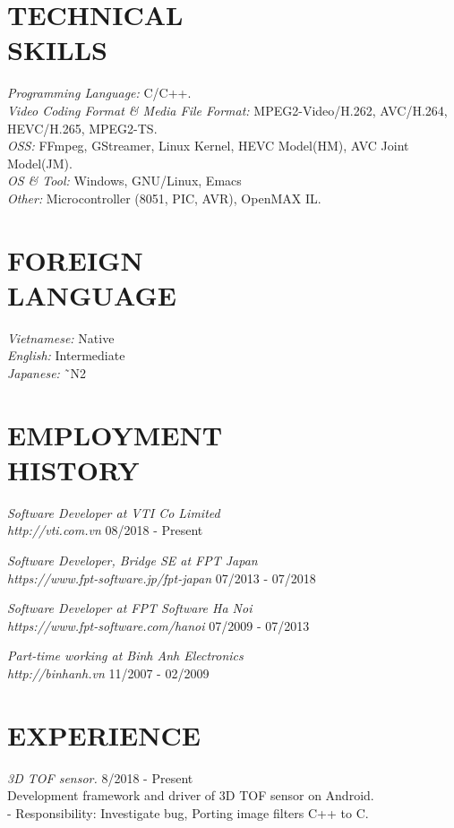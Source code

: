 \documentclass[margin]{res}
\begin{document}
\begin{resume}
\section{TECHNICAL \\ SKILLS}
        {\sl Programming Language:} C/C++. \\
        {\sl Video Coding Format \& Media File Format:} MPEG2-Video/H.262, AVC/H.264, HEVC/H.265, MPEG2-TS.\\
        {\sl OSS:} FFmpeg, GStreamer, Linux Kernel, HEVC Model(HM), AVC Joint Model(JM).\\ 
        {\sl OS \& Tool:} Windows, GNU/Linux, Emacs\\
        {\sl Other:} Microcontroller (8051, PIC, AVR), OpenMAX IL.

\section{FOREIGN \\ LANGUAGE}
         {\sl Vietnamese:} Native  \\
         {\sl English:}  Intermediate\\
         {\sl Japanese:} \~\ N2  \\

 
\section{EMPLOYMENT \\ HISTORY}
		 {\sl Software Developer at VTI Co Limited \\ http://vti.com.vn}  \hfill 08/2018 - Present
		 
                 {\sl Software Developer, Bridge SE at FPT Japan \\ https://www.fpt-software.jp/fpt-japan}  \hfill 07/2013 - 07/2018
		 
                 {\sl Software Developer at FPT Software Ha Noi \\ https://www.fpt-software.com/hanoi}  \hfill 07/2009 - 07/2013

		 {\sl Part-time working at Binh Anh Electronics \\http://binhanh.vn}   \hfill 11/2007 - 02/2009
        
\section{EXPERIENCE}
                {\sl 3D TOF sensor.} \hfill            8/2018 - Present \\
		 Development framework and driver of 3D TOF sensor on Android.\\
		 - Responsibility: Investigate bug, Porting image filters C++ to C.



\end{resume}
\end{document}
